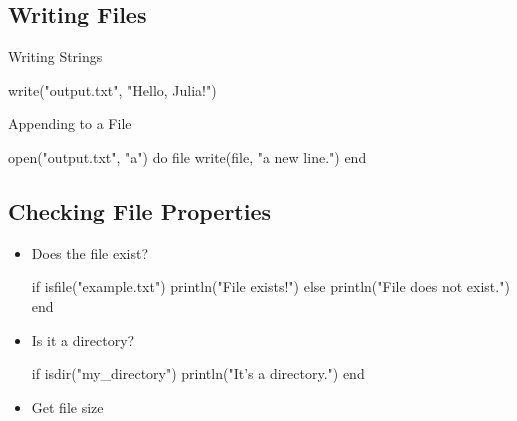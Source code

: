 \documentclass{report}
\begin{document}
     \bigbreak \noindent 
     \subsection{Writing Files}
     \bigbreak \noindent 
     Writing Strings
     \bigbreak \noindent 
     \begin{jlcode}
     write("output.txt", "Hello, Julia!")
     \end{jlcode}
     \bigbreak \noindent 
     Appending to a File
     \bigbreak \noindent 
     \begin{jlcode}
         open("output.txt", "a") do file
             write(file, "\nAdding a new line.")
         end
     \end{jlcode}

     \bigbreak \noindent 
     \subsection{Checking File Properties}
     \bigbreak \noindent 
     \begin{itemize}
         \item Does the file exist?
             \bigbreak \noindent 
             \begin{jlcode}
                 if isfile("example.txt")
                     println("File exists!")
                 else
                     println("File does not exist.")
                 end
             \end{jlcode}
         \item Is it a directory?
             \bigbreak \noindent 
             \begin{jlcode}
                 if isdir("my_directory")
                     println("It's a directory.")
                 end
             \end{jlcode}
         \item Get file size
             \bigbreak \noindent 
     \end{itemize}

     \bigbreak \noindent 
\end{document}

